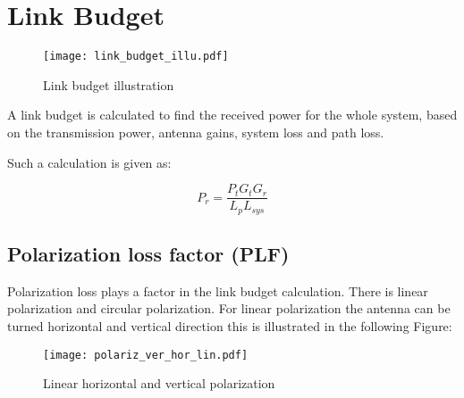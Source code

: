 \chapter{Link Budget}

\begin{figure}[H]
\centering
\texttt{[image: link\_budget\_illu.pdf]}
\caption{Link budget illustration}
\label{dijdkkfkf}
\end{figure}







A link budget is calculated to find the received power for the whole system, based on the transmission power, antenna gains, system loss and path loss.

Such a calculation is given as:

\begin{equation}
P_{r} = \frac{P_{t}G_{t}G_{r}}{L_{p}L_{sys}}
\label{link_calc}
\end{equation}

\begin{where}
\end{where}
\newpage
\section{Polarization loss factor (PLF)}
Polarization loss \citep{PLF} plays a factor in the link budget calculation. There is linear polarization and circular polarization. For linear polarization the antenna can be turned horizontal and vertical direction this is illustrated in the following Figure:

\begin{figure}[H]
\centering
\texttt{[image: polariz\_ver\_hor\_lin.pdf]}
\caption{Linear horizontal and vertical polarization \citep{plf_illu}}
\label{fig:pol_ver_hor}
\end{figure} 

